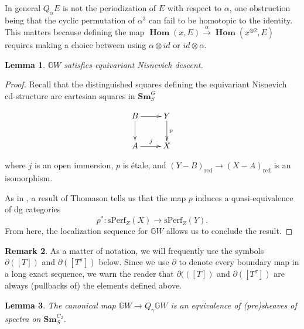 \documentclass[edeposit,fullpage]{uiucthesis2009}
\newcommand{\mbb}{\mathbb}
\newcommand{\Sm}[1]{\mathbf{Sm}_{#1}}
\DeclareMathOperator{\iHom}{\mathbf{Hom}}
\theoremstyle{plain}
\newtheorem{lemma}{Lemma}
\numberwithin{lemma}{section}
\theoremstyle{definition}
\newtheorem{remark}[lemma]{Remark}
\begin{document}
In general $Q_\alpha E$ is not the periodization of $E$ with respect
to $\alpha$, one obstruction being that the cyclic permutation of
$\alpha^3$ can fail to be homotopic to the identity. This matters
because defining the map $\iHom(x,E)
\xrightarrow{\alpha} \iHom(x^{\otimes 2}, E)$ requires making a choice
between using $\alpha \otimes id$ or $id \otimes \alpha$. 



\begin{lemma}
$\mbb GW$ satisfies equivariant Nisnevich descent. 
\end{lemma}

\begin{proof}
Recall that the distinguished squares defining the equivariant
Nisnevich cd-structure are cartesian squares in $\Sm{S}^G$ 

\[
\xymatrix{B \ar[r]\ar[d] & Y \ar[d]^p \\ A \ar[r]^j & X}
\]

where $j$ is an open immersion, $p$ is \'etale, and
$(Y-B)_{\mathrm{red}} \rightarrow (X-A)_{\mathrm{red}}$ is an
isomorphism. 

As in \cite[Theorem 9.6]{Schder}, a result of Thomason \cite[Theorem 2.6.3]{Thomason2007} tells us that the map $p$
induces a quasi-equivalence of dg categories
\[
p^* : \mathrm{sPerf}_Z(X) \rightarrow \mathrm{sPerf}_Z(Y).
\]
From here, the localization sequence for $\mbb GW$ allows us to conclude the result. 
\end{proof}

\begin{remark}
As a matter of notation, we will frequently use the symbols
$\partial([T])$ and $\partial([T^\sigma])$ below. Since we use
$\partial$ to denote every boundary map in a long exact sequence, we
warn the reader that $\partial(([T])$ and $\partial([T^\sigma])$ are
always (pullbacks of) the elements defined above. 
\end{remark}

\begin{lemma}\label{lem:GWb_eq}
The canonical map $\mbb GW \rightarrow Q_\gamma \mbb GW$ is an
equivalence of (pre)sheaves of spectra on $\Sm{S}^{C_2}$. 
\end{lemma}
\end{document}
